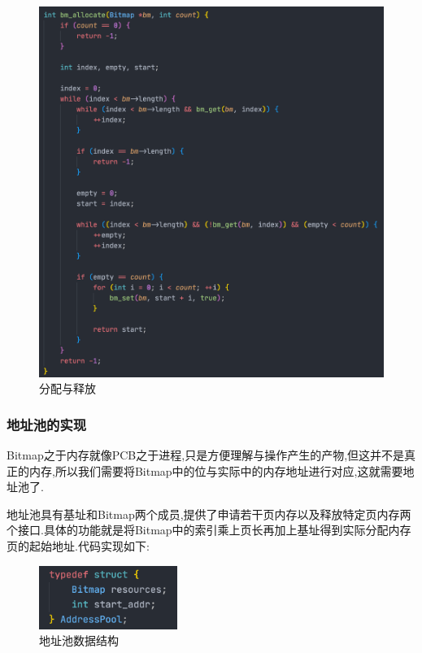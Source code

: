 \begin{figure}[H]
    \centering
    \includegraphics[width=\textwidth]{figures/bm3.png}
    \caption{分配与释放}
    \label{fig:my_label}
\end{figure}

\subsubsection{地址池的实现}
Bitmap之于内存就像PCB之于进程,只是方便理解与操作产生的产物,但这并不是真正的内存,所以我们需要将Bitmap中的位与实际中的内存地址进行对应,这就需要地址池了.

地址池具有基址和Bitmap两个成员,提供了申请若干页内存以及释放特定页内存两个接口.具体的功能就是将Bitmap中的索引乘上页长再加上基址得到实际分配内存页的起始地址.代码实现如下:

\begin{figure}[H]
    \centering
    \includegraphics[width=0.4\textwidth]{figures/ap0.png}
    \caption{地址池数据结构}
    \label{fig:my_label}
\end{figure}

